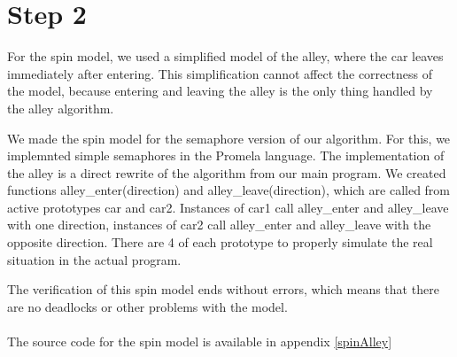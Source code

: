 
\section{Step 2}

For the spin model, we used a simplified model of the alley, where the car leaves immediately after entering. This simplification cannot affect the correctness of the model, because entering and leaving the alley is the only thing handled by the alley algorithm.

We made the spin model for the semaphore version of our algorithm. For this, we implemnted simple semaphores in the Promela language.
The implementation of the alley is a direct rewrite of the algorithm from our main program. We created functions alley\_enter(direction) and alley\_leave(direction), which are called from active prototypes car and car2. Instances of car1 call alley\_enter and alley\_leave with one direction, instances of car2 call alley\_enter and alley\_leave with the opposite direction. There are 4 of each prototype to properly simulate the real situation in the actual program.

The verification of this spin model ends without errors, which means that there are no deadlocks or other problems with the model.
~\\~\\
The source code for the spin model is available in appendix {\ref{spinAlley}}
